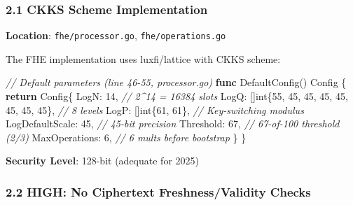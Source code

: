 \documentclass[
]{article}
\newenvironment{Shaded}{}{}
\newcommand{\CommentTok}[1]{\textcolor[rgb]{0.38,0.63,0.69}{\textit{#1}}}
\newcommand{\ControlFlowTok}[1]{\textcolor[rgb]{0.00,0.44,0.13}{\textbf{#1}}}
\newcommand{\DataTypeTok}[1]{\textcolor[rgb]{0.56,0.13,0.00}{#1}}
\newcommand{\DecValTok}[1]{\textcolor[rgb]{0.25,0.63,0.44}{#1}}
\newcommand{\KeywordTok}[1]{\textcolor[rgb]{0.00,0.44,0.13}{\textbf{#1}}}
\newcommand{\NormalTok}[1]{#1}
\newcommand{\OperatorTok}[1]{\textcolor[rgb]{0.40,0.40,0.40}{#1}}
\begin{document}
\subsubsection{2.1 CKKS Scheme
Implementation}\label{21-ckks-scheme-implementation}

\textbf{Location}: \texttt{fhe/processor.go}, \texttt{fhe/operations.go}

The FHE implementation uses luxfi/lattice with CKKS scheme:

\begin{Shaded}
\begin{Highlighting}[]
\CommentTok{// Default parameters (line 46{-}55, processor.go)}
\KeywordTok{func}\NormalTok{ DefaultConfig}\OperatorTok{()}\NormalTok{ Config }\OperatorTok{\{}
    \ControlFlowTok{return}\NormalTok{ Config}\OperatorTok{\{}
\NormalTok{        LogN}\OperatorTok{:}            \DecValTok{14}\OperatorTok{,}                              \CommentTok{// 2\^{}14 = 16384 slots}
\NormalTok{        LogQ}\OperatorTok{:}            \OperatorTok{[]}\DataTypeTok{int}\OperatorTok{\{}\DecValTok{55}\OperatorTok{,} \DecValTok{45}\OperatorTok{,} \DecValTok{45}\OperatorTok{,} \DecValTok{45}\OperatorTok{,} \DecValTok{45}\OperatorTok{,} \DecValTok{45}\OperatorTok{,} \DecValTok{45}\OperatorTok{,} \DecValTok{45}\OperatorTok{\},} \CommentTok{// 8 levels}
\NormalTok{        LogP}\OperatorTok{:}            \OperatorTok{[]}\DataTypeTok{int}\OperatorTok{\{}\DecValTok{61}\OperatorTok{,} \DecValTok{61}\OperatorTok{\},}                   \CommentTok{// Key{-}switching modulus}
\NormalTok{        LogDefaultScale}\OperatorTok{:} \DecValTok{45}\OperatorTok{,}                              \CommentTok{// 45{-}bit precision}
\NormalTok{        Threshold}\OperatorTok{:}       \DecValTok{67}\OperatorTok{,}                              \CommentTok{// 67{-}of{-}100 threshold (2/3)}
\NormalTok{        MaxOperations}\OperatorTok{:}   \DecValTok{6}\OperatorTok{,}                               \CommentTok{// 6 mults before bootstrap}
    \OperatorTok{\}}
\OperatorTok{\}}
\end{Highlighting}
\end{Shaded}

\textbf{Security Level}: 128-bit (adequate for 2025)

\subsubsection{2.2 HIGH: No Ciphertext Freshness/Validity
Checks}\label{22-high-no-ciphertext-freshnessvalidity-checks}
\end{document}
